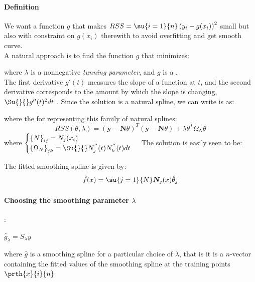 \paragraph{Definition}
We want a function $g$ that makes $RSS=\su{{i=1}}{n}\left(y_{i}-
g(x_{i})\right)^{2}$ small but also with constraint on $g(x_{i})$
therewith to avoid overfitting and get smooth curve.\\
A natural approach is to find the function $g$ that minimizes:
\begin{center}
\end{center}
where $\lambda$ is a nonnegative \emph{tunning parameter}, and $g$ is
a .\\

The first derivative $g'(t)$ measures the slope of a function at $t$,
and the second derivative corresponds to the amount by which the slope
is changing, \\
$\Su{}{}g''(t)^{2}dt$ .
Since the solution is a natural spline, we can write is as:
\begin{center}
\end{center}
where the  for representing this
family of natural splines:
$$ RSS(\theta, \lambda) = \left(\bm{y}-\bm{N}\theta\right)^{T}\left(\bm{y}-\bm{N}\theta\right) +
\lambda\theta^{T}\Omega_{N}\theta$$ where 
$\begin{cases}
\left\{N\right\}_{ij} = N_{j}(x_{i})\\
\left\{\Omega_{N}\right\}_{jk} = \Su{}{}N_{j}^{''}(t)N_{k}^{''}(t)dt
\end{cases}$
The solution is easily seen to be:
\begin{center}
\end{center}
The fitted smoothing spline is given by:
$$\hat{f}(x)=\su{{j=1}}{N}\bm{N}_{j}(x)\hat{\theta}_{j}$$

\paragraph{Choosing the smoothing parameter $\lambda$}
:
\begin{center}
$\hat{g}_{\lambda}=S_{\lambda}y$
\end{center}
where $\hat{g}$ is a smoothing spline for a particular choice of 
$\lambda$, that is it is a $n$-vector containing the fitted values of 
the smoothing spline at the training points $\prth{x}{i}{n}$\\

